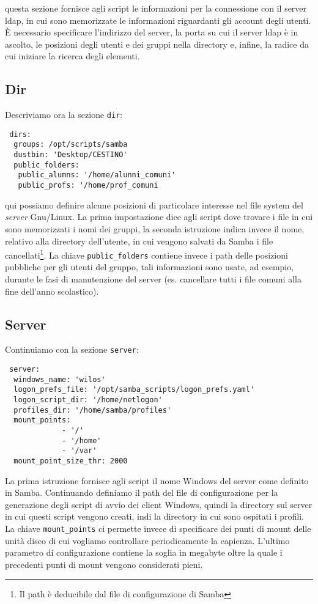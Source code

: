 \documentclass[a4paper,10pt,oneside]{memoir}
\begin{document}
questa sezione fornisce agli script le informazioni per la connessione con il server ldap, in cui sono memorizzate le informazioni riguardanti gli account degli utenti.
È necessario specificare l'indirizzo del server, la porta su cui il server ldap è in ascolto, le posizioni degli utenti e dei gruppi nella directory e, infine, la radice da cui iniziare la ricerca degli elementi.
\subsection*{Dir}

Descriviamo ora la sezione \verb#dir#:
\begin{verbatim}
 dirs:
  groups: /opt/scripts/samba
  dustbin: 'Desktop/CESTINO' 
  public_folders:
   public_alumns: '/home/alunni_comuni'
   public_profs: '/home/prof_comuni
\end{verbatim}

qui possiamo definire alcune posizioni di particolare interesse nel file system del \emph{server} Gnu/Linux. La prima impostazione dice agli script dove trovare i file in cui sono memorizzati i nomi dei gruppi, la seconda istruzione indica invece il nome, relativo alla directory dell'utente, in cui vengono salvati da Samba i file cancellati\footnote{Il path è deducibile dal file di configurazione di Samba}. La chiave \verb#public_folders# contiene invece i path delle posizioni pubbliche per gli utenti del gruppo, tali informazioni sono usate, ad esempio, durante le fasi di manutenzione del server (es. cancellare tutti i file comuni alla fine dell'anno scolastico).

\subsection*{Server}

Continuiamo con la sezione \verb#server#:
\begin{verbatim}
 server:
  windows_name: 'wilos'
  logon_prefs_file: '/opt/samba_scripts/logon_prefs.yaml'
  logon_script_dir: '/home/netlogon'
  profiles_dir: '/home/samba/profiles'
  mount_points:
             - '/'
             - '/home'
             - '/var'
  mount_point_size_thr: 2000
\end{verbatim}
La prima istruzione fornisce agli script il nome Windows del server come definito in Samba. Continuando definiamo il path del file di configurazione per la generazione degli script di avvio dei client Windows, quindi la directory sul server in cui questi script vengono creati, indi  la directory in cui sono ospitati i profili. La chiave \verb#mount_points# ci permette invece di specificare dei punti di mount delle unità disco di cui vogliamo controllare periodicamente la capienza. L'ultimo parametro di configurazione contiene la soglia in megabyte oltre la quale i precedenti punti di mount vengono considerati pieni.
\end{document}
